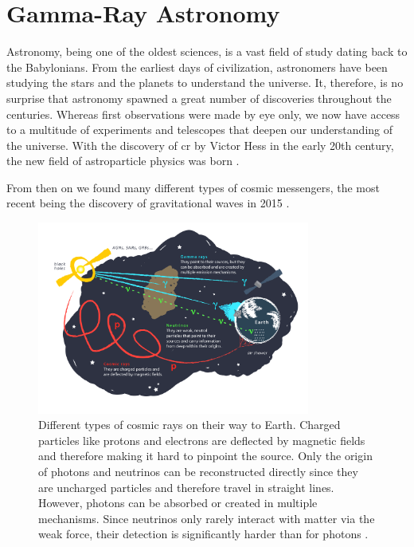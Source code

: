 \chapter{Gamma-Ray Astronomy}
\label{ch:gamma-ray-astronomy}

Astronomy, being one of the oldest sciences, is a vast field of study dating back to the Babylonians.
From the earliest days of civilization, astronomers have been studying the stars and the planets to
understand the universe. It, therefore, is no surprise that astronomy spawned a great number of discoveries
throughout the centuries. Whereas first observations were made by eye only, we now have access to a multitude
of experiments and telescopes that deepen our understanding of the universe. With the discovery of
\gls{cr} by Victor Hess in the early 20th century, the new field of astroparticle physics was born \cite{longair1981}.

From then on we found many different types of cosmic messengers, the most recent being the discovery of
gravitational waves in 2015 \cite{PhysRevLett.116.061102}.

\begin{figure}
    \centering
    \includegraphics[width=0.8\textwidth]{graphics/figure5.png}
    \caption{Different types of cosmic rays on their way to Earth. Charged particles like protons and electrons
    are deflected by magnetic fields and therefore making it hard to pinpoint the source. Only the
    origin of photons and neutrinos can be reconstructed directly since they are uncharged particles
    and therefore travel in straight lines. However, photons can be absorbed or created in multiple
    mechanisms. Since neutrinos only rarely interact with matter via the weak force, their detection
    is significantly harder than for photons \cite{fig5}.}
    \label{fig:fig5}
\end{figure}

